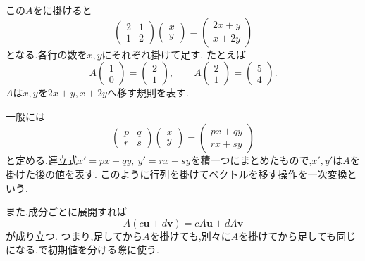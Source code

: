 この$A$をに掛けると
\[
  \begin{pmatrix}2&1\\1&2\end{pmatrix}
  \begin{pmatrix}x\\y\end{pmatrix}
  =
  \begin{pmatrix}2x+y\\x+2y\end{pmatrix}
\]
となる.各行の数を$x,y$にそれぞれ掛けて足す.
たとえば
\[
  A\begin{pmatrix}1\\0\end{pmatrix}
  =\begin{pmatrix}2\\1\end{pmatrix},
  \qquad
  A\begin{pmatrix}2\\1\end{pmatrix}
  =\begin{pmatrix}5\\4\end{pmatrix}.
\]
$A$は$x,y$を$2x+y,x+2y$へ移す規則を表す.
\BookFigMatrixMap

一般には
\[
  \begin{pmatrix}p&q\\r&s\end{pmatrix}
  \begin{pmatrix}x\\y\end{pmatrix}
  =\begin{pmatrix}px+qy\\rx+sy\end{pmatrix}
\]
と定める.連立式$x'=px+qy,\ y'=rx+sy$を積一つにまとめたもので,$x',y'$は$A$を掛けた後の値を表す.
このように行列を掛けてベクトルを移す操作を一次変換という.

また,成分ごとに展開すれば
\[
  A(c\boldsymbol{u}+d\boldsymbol{v})
  =cA\boldsymbol{u}+dA\boldsymbol{v}
\]
が成り立つ.
つまり,足してから$A$を掛けても,別々に$A$を掛けてから足しても同じになる.で初期値を分ける際に使う.

